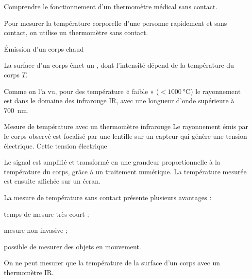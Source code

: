 \tetePremStssLumi
\vspace*{-32pt}

\begin{objectifs}
  \item Comprendre le fonctionnement d'un thermomètre médical sans contact.
\end{objectifs}

\begin{contexte}
  Pour mesurer la température corporelle d'une personne rapidement et sans contact, on utilise un thermomètre sans contact.
  
\end{contexte}


\begin{doc}{Émission d'un corps chaud}
  \begin{importants}
    La surface d'un corps émet un , dont l'intensité dépend de la température du corps $T$.
  \end{importants}

  Comme on l'a vu, pour des température « faible » ($< \qty{1000}{\degreeCelsius}$) le rayonnement est dans le domaine des infrarouge IR, avec une longueur d'onde supérieure à \qty{700}{\nm}.
\end{doc}

\begin{doc}{Mesure de température avec un thermomètre infrarouge}
  Le rayonnement émis par le corps observé est focalisé par une lentille sur un capteur qui génère une tension électrique.
  Cette tension électrique 
  
  Le signal est amplifié et transformé en une grandeur proportionnelle à la température du corps, grâce à un traitement numérique.
  La température mesurée est ensuite affichée sur un écran.

  La mesure de température sans contact présente plusieurs avantages :
  \begin{listePoints}
    \item temps de mesure très court ;
    \item mesure non invasive ;
    \item possible de mesurer des objets en mouvement.
  \end{listePoints}

  \begin{center}
  \end{center}

  On ne peut mesurer que la température de la surface d'un corps avec un thermomètre IR.
\end{doc}

